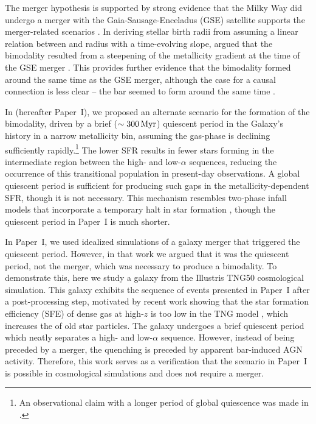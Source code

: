 The merger hypothesis is supported by strong evidence that the Milky Way did undergo a merger with the Gaia-Sausage-Enceladus (GSE) satellite supports the merger-related scenarios \citep{2018MNRAS.478..611B,2018Natur.563...85H,2020ApJ...901...48N,2024ApJ...972..112C}. In deriving stellar birth radii from assuming a linear relation between \FeH{} and radius with a time-evolving slope, \citet{2024MNRAS.535..392L} argued that the bimodality resulted from a steepening of the metallicity gradient at the time of the GSE merger \citep[see also][]{2023MNRAS.525.2208R}. This provides further evidence that the bimodality formed around the same time as the GSE merger, although the case for a causal connection is less clear -- the bar seemed to form around the same time \citep[e.g][]{2019MNRAS.490.4740B,2024MNRAS.530.2972S}.

In \citet{2024arXiv240707985B} (hereafter Paper~I), we proposed an alternate scenario for the formation of the bimodality, driven by a brief ($\sim300\,\textrm{Myr}$) quiescent period in the Galaxy's history in a narrow metallicity bin, assuming the gas-phase \alphaFe{} is declining sufficiently rapidly.\footnote{An observational claim with a longer period of global quiescence was made in \citet{2016A&A...589A..66H}.} The lower SFR results in fewer stars forming in the intermediate region between the high- and low-$\alpha$ sequences, reducing the occurrence of this transitional population in present-day observations. A global quiescent period is sufficient for producing such gaps in the metallicity-dependent SFR, though it is not necessary. This mechanism resembles two-phase infall models that incorporate a temporary halt in star formation \citep[][and references therein]{2024arXiv240511025S}, though the quiescent period in Paper~I is much shorter.

In Paper~I, we used idealized simulations of a galaxy merger that triggered the quiescent period. However, in that work we argued that it was the quiescent period, not the merger, which was necessary to produce a bimodality. To demonstrate this, here we study a galaxy from the Illustris TNG50 cosmological simulation. This galaxy exhibits the sequence of events presented in Paper~I after a post-processing step, motivated by recent work showing that the star formation efficiency (SFE) of dense gas at high-$z$ is too low in the TNG model \citep{2024arXiv240909121H}, which increases the \alphaFe{} of old star particles. The galaxy undergoes a brief quiescent period which neatly separates a high- and low-$\alpha$ sequence. However, instead of being preceded by a merger, the quenching is preceded by apparent bar-induced AGN activity. Therefore, this work serves as a verification that the scenario in Paper~I is possible in cosmological simulations and does not require a merger.

